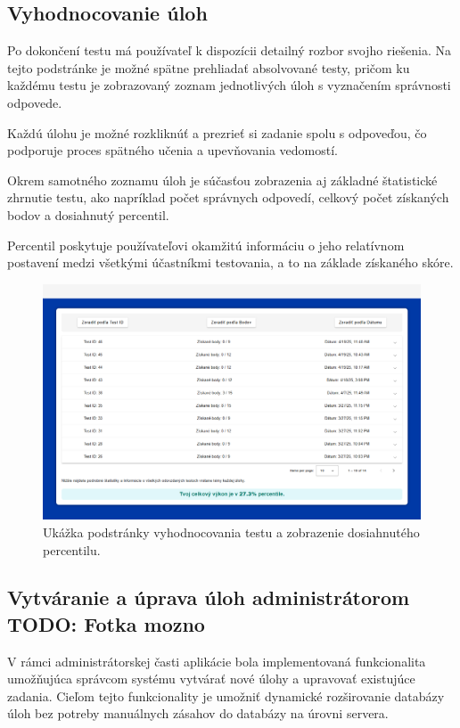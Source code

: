 \subsection{Vyhodnocovanie úloh}

Po dokončení testu má používateľ k dispozícii detailný rozbor svojho riešenia. 
Na tejto podstránke je možné spätne prehliadať absolvované testy, pričom ku každému testu je zobrazovaný zoznam jednotlivých úloh s vyznačením správnosti odpovede.

 Každú úlohu je možné rozkliknúť a prezrieť si zadanie spolu s odpoveďou, čo podporuje proces spätného učenia a upevňovania vedomostí.

Okrem samotného zoznamu úloh je súčasťou zobrazenia aj základné štatistické zhrnutie testu, ako napríklad počet správnych odpovedí, celkový počet získaných bodov a dosiahnutý percentil.

Percentil poskytuje používateľovi okamžitú informáciu o jeho relatívnom postavení medzi všetkými účastníkmi testovania, a to na základe získaného skóre.


\begin{figure}[H]
  \centering
  \includegraphics[width=14cm]{img/test-results.png}
  \caption{Ukážka podstránky vyhodnocovania testu a zobrazenie dosiahnutého percentilu.}
  \label{test-results}
\end{figure}



\subsection{Vytváranie a úprava úloh administrátorom TODO: Fotka mozno}

V rámci administrátorskej časti aplikácie bola implementovaná funkcionalita umožňujúca správcom systému vytvárať nové úlohy a upravovať existujúce zadania.
 Cieľom tejto funkcionality je umožniť dynamické rozširovanie databázy úloh bez potreby manuálnych zásahov do databázy na úrovni servera.

